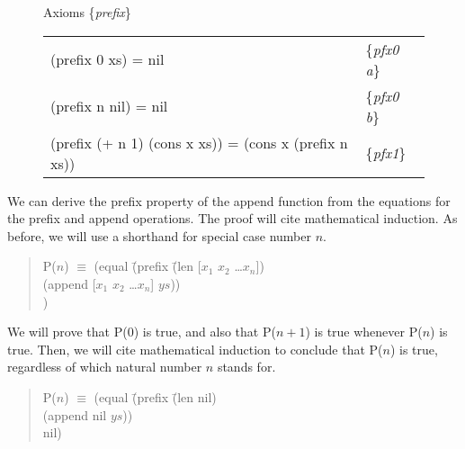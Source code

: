 \begin{figure}
\begin{samepage}
\label{prefix-equations}
\begin{center}
Axioms \{\emph{prefix}\}                                           \\
\begin{tabular}{ll}
(prefix 0 xs) = nil                                   & \{\emph{pfx0 a}\}  \\
(prefix n nil) =  nil                                 & \{\emph{pfx0 b}\}  \\
(prefix (+ n 1) (cons x xs)) = (cons x (prefix n xs)) & \{\emph{pfx1}\}   \\
\end{tabular}
\end{center}
\end{samepage}
\end{figure}

We can derive the prefix property of the append function from the equations for the prefix and append operations.
The proof will cite mathematical induction.  As before, we will use a shorthand for special case number $n$.


\begin{quote}
\begin{tabbing}
P($n$) $\equiv$ (equal \=(prefix \=(len [$x_1$ $x_2$ \dots $x_n$])          \\
                       \>        \>(append [$x_1$ $x_2$ \dots $x_n$] $ys$)) \\
                       \>[$x_1$ $x_2$ \dots $x_n$])                         \\
\end{tabbing}
\end{quote}

We will prove that P(0) is true, and also that P($n+1$) is true whenever P($n$) is true. Then, we will cite mathematical induction to conclude that P($n$) is true, regardless of which natural number $n$ stands for.

\begin{quote}
\begin{tabbing}
P($n$) $\equiv$ (equal \=(prefix \=(len nil)          \\
                       \>        \>(append nil $ys$)) \\
                       \>nil)                         \\
\end{tabbing}
\end{quote}

